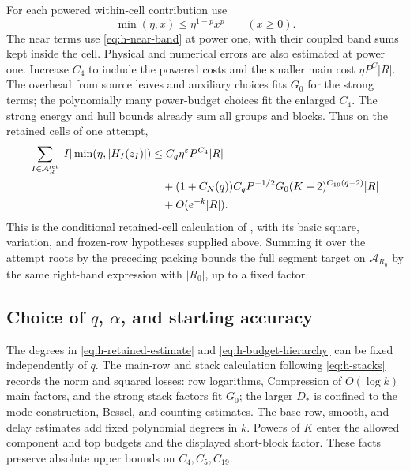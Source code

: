 For each powered within-cell contribution use
\[
 \min(\eta,x)\le\eta^{1-p}x^p\qquad(x\ge0).
\]
The near terms use \eqref{eq:h-near-band} at power one, with
their coupled band sums kept inside the cell.  Physical and
numerical errors are also estimated at power one.  Increase
\(C_4\) to include the powered costs and the smaller main cost
\(\eta P^C|R|\).  The overhead from source leaves and auxiliary
choices fits \(G_0\) for the strong terms; the polynomially many
power-budget choices fit the enlarged \(C_4\).  The strong energy
and hull bounds already sum all groups and blocks.  Thus on the
retained cells of one attempt,
\begin{equation}
 \begin{aligned}
 \sum_{I\in\mathcal A_R^{\rm ret}}|I|
        \min(\eta,|H_I(z_I)|)
 &\le C_q\eta^\varepsilon P^{C_4}|R|\\
 &\quad +(1+C_N(q))C_qP^{-1/2}G_0
                (K+2)^{C_{19}(q-2)}|R|\\
 &\quad +O(e^{-k}|R|).
 \end{aligned}
 \label{eq:h-retained-estimate}
\end{equation}
This is the conditional retained-cell calculation of
\cite[Section~10]{H}, with its basic square, variation, and
frozen-row hypotheses supplied above.  Summing it over the
attempt roots by the preceding packing bounds the full segment
target on \(\mathcal A_{R_0}\) by the same right-hand expression
with \(|R_0|\), up to a fixed factor.

\subsection{\texorpdfstring{Choice of \(q\), \(\alpha\), and starting accuracy}{Choice of q, alpha, and starting accuracy}}

The degrees in \eqref{eq:h-retained-estimate} and
\eqref{eq:h-budget-hierarchy} can be fixed independently of
\(q\).  The main-row and stack calculation following
\eqref{eq:h-stacks} records the norm and squared losses:
row logarithms, Compression of \(O(\log k)\) main factors,
and the strong stack factors fit \(G_0\); the larger \(D_*\)
is confined to the mode construction, Bessel, and counting estimates.  The base
row, smooth, and delay estimates add fixed polynomial degrees
in \(k\).  Powers of \(K\) enter the allowed component and top
budgets and the displayed short-block factor.  These facts
preserve absolute upper bounds on \(C_4,C_5,C_{19}\).

